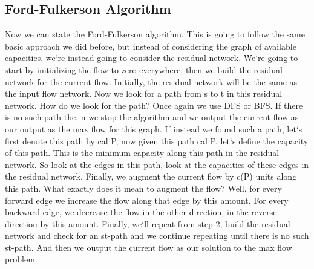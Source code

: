 \subsection{Ford-Fulkerson Algorithm}
Now we can state the Ford-Fulkerson algorithm.
This is going to follow the same basic approach we did before, but instead of considering the graph of available capacities, we`re instead going to consider the residual network.
We`re going to start by initializing the flow to zero everywhere, then we build the residual network for the current flow.
Initially, the residual network will be the same as the input flow network.
Now we look for a path from s to t in this residual network.
How do we look for the path? Once again we use DFS or BFS\@.
If there is no such path the, n we stop the algorithm and we output the current flow as our output as the max flow for this graph.
If instead we found such a path, let`s first denote this path by cal P, now given this path cal P, let`s define the capacity of this path.
This is the minimum capacity along this path in the residual network.
So look at the edges in this path, look at the capacities of these edges in the residual network.
Finally, we augment the current flow by c(P) units along this path.
What exactly does it mean to augment the flow? Well, for every forward edge we increase the flow along that edge by this amount.
For every backward edge, we decrease the flow in the other direction, in the reverse direction by this amount.
Finally, we`ll repeat from step 2, build the residual network and check for an st-path and we continue repeating until there is no such st-path.
And then we output the current flow as our solution to the max flow problem.

